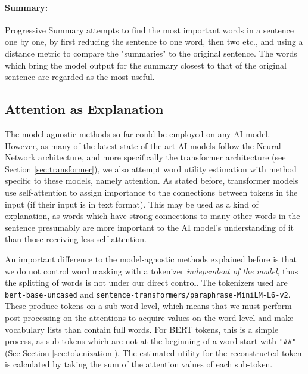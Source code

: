 \paragraph{Summary:}
Progressive Summary attempts to find the most important words in a sentence one by one, by first reducing the sentence to one word, then two etc., and using a distance metric to compare the "summaries" to the original sentence.
The words which bring the model output for the summary closest to that of the original sentence are regarded as the most useful.

\subsection{Attention as Explanation}
The model-agnostic methods so far could be employed on any AI model.
However, as many of the latest state-of-the-art AI models follow the Neural Network architecture, and more specifically the transformer architecture (see Section \ref{sec:transformer}), we also attempt word utility estimation with method specific to these models, namely attention.
As stated before, transformer models use self-attention to assign importance to the connections between tokens in the input (if their input is in text format).
This may be used as a kind of explanation, as words which have strong connections to many other words in the sentence presumably are more important to the AI model's understanding of it than those receiving less self-attention.

An important difference to the model-agnostic methods explained before is that we do not control word masking with a tokenizer \textit{independent of the model}, thus the splitting of words is not under our direct control.
The tokenizers used are \texttt{bert-base-uncased} and \texttt{sentence-transformers/paraphrase-MiniLM-L6-v2}.
These produce tokens on a sub-word level, which means that we must perform post-processing on the attentions to acquire values on the word level and make vocabulary lists than contain full words.
For BERT tokens, this is a simple process, as sub-tokens which are not at the beginning of a word start with \texttt{"\#\#"}(See Section \ref{sec:tokenization}).
The estimated utility for the reconstructed token is calculated by taking the sum of the attention values of each sub-token.

